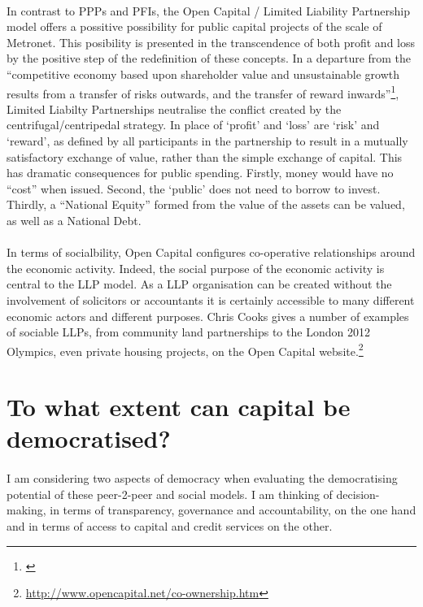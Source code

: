 \documentclass[12pt,a4paper,titlepage]{article}
\begin{document}
\paragraph{}In contrast to PPPs and PFIs, the Open Capital / Limited Liability Partnership model offers a possitive possibility for public capital projects of the scale of Metronet. This posibility is presented in the transcendence of both profit and loss by the positive step of the redefinition of these concepts. In a departure from the ``competitive economy based upon shareholder value and unsustainable growth results from a transfer of risks outwards, and the transfer of reward inwards''\footnote{\cite[p. 17]{cook:2004cp}}, Limited Liabilty Partnerships neutralise the conflict created by the centrifugal/centripedal strategy. In place of `profit' and `loss' are `risk' and `reward', as defined by all participants in the partnership to result in a mutually satisfactory exchange of value, rather than the simple exchange of capital. This has dramatic consequences for public spending. Firstly, money would have no “cost” when issued. Second, the `public' does not need to borrow to invest. Thirdly, a ``National Equity'' formed from the value of the assets can be valued, as well as a National Debt.

\paragraph{}In terms of socialbility, Open Capital configures co-operative relationships around the economic activity. Indeed, the social purpose of the economic activity is central to the LLP model. As a LLP organisation can be created without the involvement of solicitors or accountants it is certainly accessible to many different economic actors and different purposes. Chris Cooks gives a number of examples of sociable LLPs, from community land partnerships to the London 2012 Olympics, even private housing projects, on the Open Capital website.\footnote{\url{http://www.opencapital.net/co-ownership.htm}}

\newpage
\section{To what extent can capital be democratised?}

\paragraph{}I am considering two aspects of democracy when evaluating the democratising potential of these peer-2-peer and social models. I am thinking of decision-making, in terms of transparency, governance and accountability, on the one hand and in terms of access to capital and credit services on the other.
\end{document}
